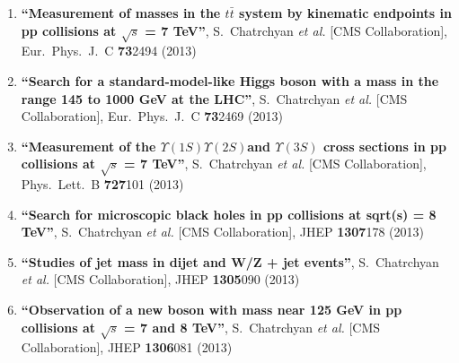 \begin{enumerate}
\item%
{\bf ``Measurement of masses in the $t \bar{t}$ system by kinematic endpoints in pp collisions at $\sqrt{s}$ = 7 TeV''}, 
  S.~Chatrchyan {\it et al.}  [CMS Collaboration], 
Eur.\ Phys.\ J.\ C {\bf 73}2494 (2013) %


\item%
{\bf ``Search for a standard-model-like Higgs boson with a mass in the range 145 to 1000 GeV at the LHC''}, 
  S.~Chatrchyan {\it et al.}  [CMS Collaboration], 
Eur.\ Phys.\ J.\ C {\bf 73}2469 (2013) %


\item%
{\bf ``Measurement of the $\Upsilon(1S)\Upsilon(2S)$and $\Upsilon(3S)$ cross sections in pp collisions at $\sqrt{s}$ = 7 TeV''}, 
  S.~Chatrchyan {\it et al.}  [CMS Collaboration], 
Phys.\ Lett.\ B {\bf 727}101 (2013) %


\item%
{\bf ``Search for microscopic black holes in pp collisions at sqrt(s) = 8 TeV''}, 
  S.~Chatrchyan {\it et al.}  [CMS Collaboration], 
JHEP {\bf 1307}178 (2013) %


\item%
{\bf ``Studies of jet mass in dijet and W/Z + jet events''}, 
  S.~Chatrchyan {\it et al.}  [CMS Collaboration], 
JHEP {\bf 1305}090 (2013) %


\item%
{\bf ``Observation of a new boson with mass near 125 GeV in pp collisions at $\sqrt{s}$ = 7 and 8 TeV''}, 
  S.~Chatrchyan {\it et al.}  [CMS Collaboration], 
JHEP {\bf 1306}081 (2013) %



\end{enumerate}

